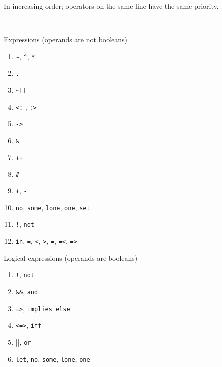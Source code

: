 \documentclass{article}
\newlength\tw
\begin{document}
In increasing order; operators on the same line have the same priority.

~

\begin{minipage}[t]{\tw}
Expressions (operands are not booleans)
\begin{enumerate}
\itemsep=0em
\item \verb|~|, \verb|^|, \verb|*|
\item \verb|.|
\item \verb|~[]|
\item \verb|<:| , \verb|:>|
\item \verb|->|
\item \verb|&|
\item \verb|++|
\item \verb|#|
\item \verb|+|, \verb|-|
\item \verb|no|, \verb|some|, \verb|lone|, \verb|one|, \verb|set|
\item \verb|!|, \verb|not|
\item \verb|in|, \verb|=|, \verb|<|, \verb|>|, \verb|=|, \verb|=<|, \verb|=>|
\end{enumerate}
\end{minipage}
\begin{minipage}[t]{\tw}
Logical expressions (operands are booleans) 
\begin{enumerate}
\itemsep=0em
\item \verb|!|, \verb|not|
\item \verb|&&|, \verb|and|
\item \verb|=>|, \verb|implies else|
\item \verb|<=>|, \verb|iff|
\item \verb||||, \verb|or|
\item \verb|let|, \verb|no|, \verb|some|, \verb|lone|, \verb|one|
\end{enumerate}
\end{minipage}
\end{document}
